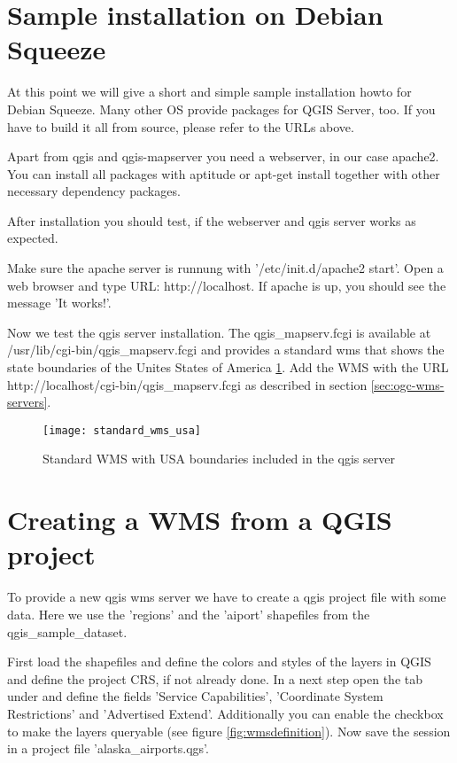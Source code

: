 \section{Sample installation on Debian Squeeze}

At this point we will give a short and simple sample installation howto for 
Debian Squeeze. Many other OS provide packages for QGIS Server, too. If you 
have to build it all from source, please refer to the URLs above.

Apart from qgis and qgis-mapserver you need a webserver, in our case apache2. 
You can install all packages with aptitude or apt-get install together 
with other necessary dependency packages.

After installation you should test, if the webserver and qgis server works as 
expected. 

Make sure the apache server is runnung with '/etc/init.d/apache2 start'. Open 
a web browser and type URL: http://localhost. If apache is up, you should see 
the message 'It works!'.

Now we test the qgis server installation. The qgis\_mapserv.fcgi is available at 
/usr/lib/cgi-bin/qgis\_mapserv.fcgi and provides a standard wms that shows the 
state boundaries of the Unites States of America \ref{fig:usa_wms}. Add 
the WMS with the URL http://localhost/cgi-bin/qgis\_mapserv.fcgi as described 
in section \ref{sec:ogc-wms-servers}.

\begin{figure}[ht]
\centering
\texttt{[image: standard\_wms\_usa]}
\caption{Standard WMS with USA boundaries included in the qgis server \nixcaption}
\label{fig:usa_wms}
\end{figure}

\section{Creating a WMS from a QGIS project}

To provide a new qgis wms server we have to create a qgis project file with some 
data. Here we use the 'regions' and the 'aiport' shapefiles from the 
qgis\_sample\_dataset. 

First load the shapefiles and define the colors and styles of the layers in 
QGIS and define the project CRS, if not already done. In a next step open the 
 tab under  \arrow {} and define the fields 'Service Capabilities', 'Coordinate System 
Restrictions' and 'Advertised Extend'. Additionally you can enable the checkbox 
 to make the layers 
queryable (see figure \ref{fig:wmsdefinition}). Now save the session in a 
project file 'alaska\_airports.qgs'. 


